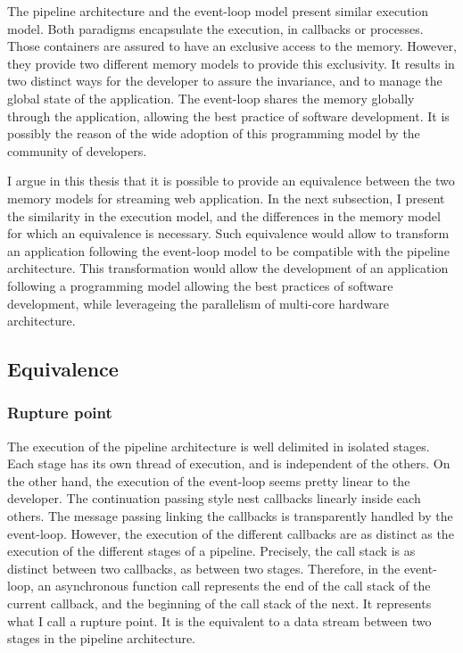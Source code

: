 
The pipeline architecture and the event-loop model present similar execution model.
Both paradigms encapsulate the execution, in callbacks or processes.
Those containers are assured to have an exclusive access to the memory.
However, they provide two different memory models to provide this exclusivity.
It results in two distinct ways for the developer to assure the invariance, and to manage the global state of the application.
The event-loop shares the memory globally through the application, allowing the best practice of software development.
It is possibly the reason of the wide adoption of this programming model by the community of developers.

I argue in this thesis that it is possible to provide an equivalence between the two memory models for streaming web application.
In the next subsection, I present the similarity in the execution model, and the differences in the memory model for which an equivalence is necessary.
Such equivalence would allow to transform an application following the event-loop model to be compatible with the pipeline architecture.
This transformation would allow the development of an application following a programming model allowing the best practices of software development, while leverageing the parallelism of multi-core hardware architecture.

\subsection{Equivalence}

\subsubsection{Rupture point}

The execution of the pipeline architecture is well delimited in isolated stages.
Each stage has its own thread of execution, and is independent of the others.
On the other hand, the execution of the event-loop seems pretty linear to the developer.
The continuation passing style nest callbacks linearly inside each others.
The message passing linking the callbacks is transparently handled by the event-loop.
However, the execution of the different callbacks are as distinct as the execution of the different stages of a pipeline.
Precisely, the call stack is as distinct between two callbacks, as between two stages.
Therefore, in the event-loop, an asynchronous function call represents the end of the call stack of the current callback, and the beginning of the call stack of the next.
It represents what I call a rupture point.
It is the equivalent to a data stream between two stages in the pipeline architecture.

